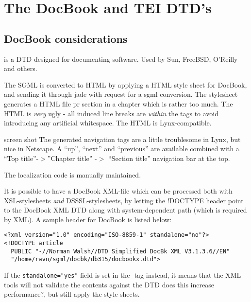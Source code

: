 
\chapter{The DocBook and TEI DTD's}

\section{DocBook considerations}
\label{sec:docbook}


 is a DTD designed for
documenting software.  Used by Sun, FreeBSD, O'Reilly and others.


\textsf{
The SGML is converted to HTML by applying a HTML style sheet for
DocBook, and sending it through jade with request for a sgml
conversion.  The stylesheet generates a HTML file pr section in a
chapter which is rather too much.  The HTML is \textit{very} ugly - all
induced line breaks are \textit{within} the tags to avoid introducing any
artificial whitespace.  The HTML is Lynx-compatible.
}

\textsf{screen shot}
The generated navigation tags are a little troublesome in Lynx, but
nice in Netscape.  A ``up'', ``next'' and ``previous'' are available
combined with a ``Top title''-$>$''Chapter title'' -$>$ ``Section title''
navigation bar at the top.

The localization code is manually maintained.

It is possible to have a DocBook XML-file which can be processed both
with XSL-stylesheets \textit{and} DSSSL-stylesheets, by letting the
!DOCTYPE header point to the DocBook XML DTD along with
system-dependent path (which is required by XML).  A sample header for
DocBook is listed below:

\begin{verbatim}
<?xml version="1.0" encoding="ISO-8859-1" standalone="no"?>
<!DOCTYPE article 
  PUBLIC "-//Norman Walsh//DTD Simplified DocBk XML V3.1.3.6//EN" 
  "/home/ravn/sgml/docbk/db315/docbookx.dtd">
\end{verbatim}

If the \texttt{standalone="yes"} field is set in the -tag
instead, it means that the XML-tools will not validate the contents
against the DTD \textsf{does this increase performance?}, but still
apply the style sheets.

